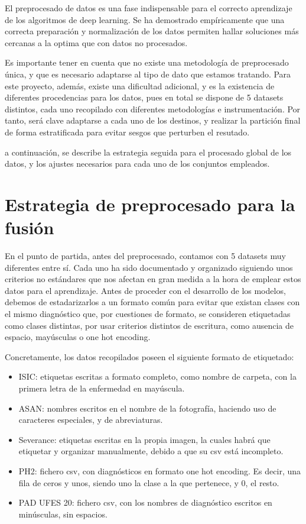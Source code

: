 El preprocesado de datos es una fase indispensable para el correcto aprendizaje de los algoritmos de deep learning. Se ha demostrado empíricamente que una correcta preparación y normalización de los datos permiten hallar soluciones más cercanas a la optima que con datos no procesados.

Es importante tener en cuenta que no existe una metodología de preprocesado única, y que es necesario adaptarse al tipo de dato que estamos tratando. Para este proyecto, además, existe una dificultad adicional, y es la existencia de diferentes procedencias para los datos, pues en total se dispone de 5 datasets distintos, cada uno recopilado con diferentes metodologías e instrumentación. Por tanto, será clave adaptarse a cada uno de los destinos, y realizar la partición final de forma estratificada para evitar sesgos que perturben el resutado.

a continuación, se describe la estrategia seguida para el procesado global de los datos, y los ajustes necesarios para cada uno de los conjuntos empleados.

\section{Estrategia de preprocesado para la fusión}

En el punto de partida, antes del preprocesado, contamos con 5 datasets muy diferentes entre sí. Cada uno ha sido documentado y organizado siguiendo unos criterios no estándares que nos afectan en gran medida a la hora de emplear estos datos para el aprendizaje. Antes de proceder con el desarrollo de los modelos, debemos de estadarizarlos a un formato común para evitar que existan clases con el mismo diagnóstico que, por cuestiones de formato, se consideren etiquetadas como clases distintas, por usar criterios distintos de escritura, como ausencia de espacio, mayúsculas o one hot encoding. 

Concretamente, los datos recopilados poseen el siguiente formato de etiquetado:
\begin{itemize}
	\item ISIC: etiquetas escritas a formato completo, como nombre de carpeta, con la primera letra de la enfermedad en mayúscula.
	\item ASAN: nombres escritos en el nombre de la fotografía, haciendo uso de caracteres especiales, y de abreviaturas.
	\item Severance: etiquetas escritas en la propia imagen, la cuales habrá que etiquetar y organizar manualmente, debido a que su csv está incompleto.
	\item PH2: fichero csv, con diagnósticos en formato one hot encoding. Es decir, una fila de ceros y unos, siendo uno la clase a la que pertenece, y 0, el resto.
	\item PAD UFES 20: fichero csv, con los nombres de diagnóstico escritos en minúsculas, sin espacios.
\end{itemize}

